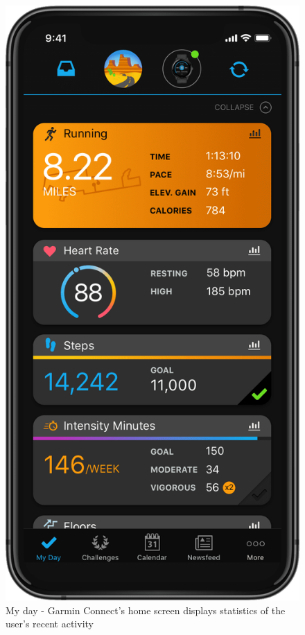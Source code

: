 \begin{figure}[h]
    \includegraphics[width=\textwidth]{Images/garmin-connect-myday-screen.png}
    \caption{My day - Garmin Connect's home screen displays statistics of the user's recent activity\cite{garmin-my-day-img}}
\end{figure}

